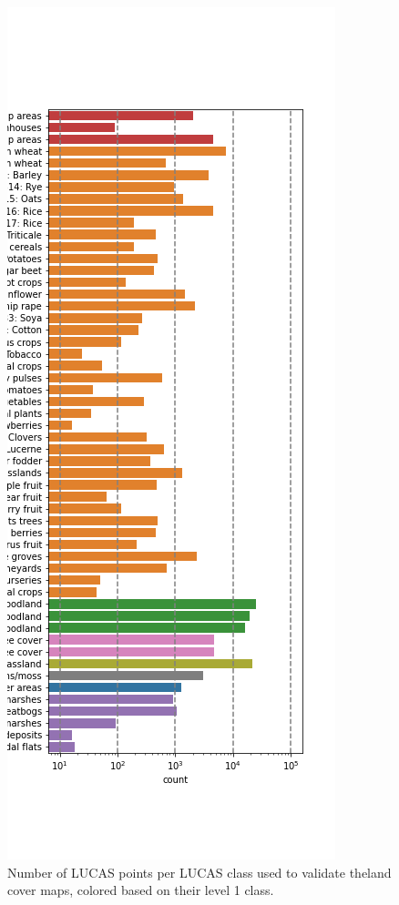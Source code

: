 \begin{figure}[h]
    \centering
    \includegraphics[width=\textwidth]{figs_05/fig_lucas_aoi_counts.png}
    \caption{Number of LUCAS points per LUCAS class used to validate theland cover maps, colored based on their level 1 class.}
    \label{fig:05_lucas_aoi_counts}
\end{figure}

